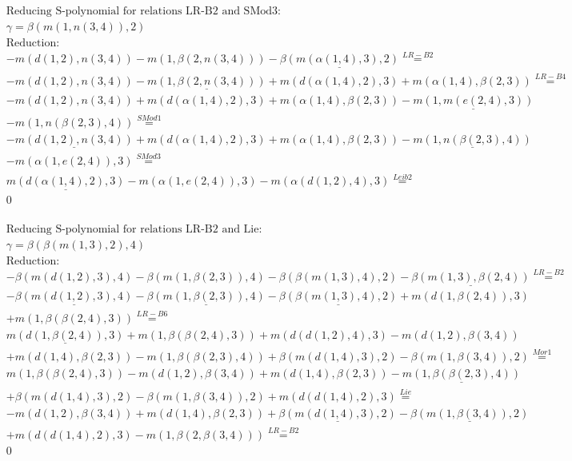 \documentclass[11pt]{amsart}
\begin{document}
\begin{align*} 
& \text{Reducing S-polynomial for relations LR-B2 and SMod3:} \\ 
& \gamma = \beta(m(1,n(3,4)),2) \\ 
& \text{Reduction}: \\& - m(d(1,2),n(3,4)) - m(1,\beta(2,n(3,4))) - \underline{\beta(m(\alpha(1,4),3),2)} \stackrel{ LR-B2 }{=}  \\ 
& - m(d(1,2),n(3,4)) - \underline{m(1,\beta(2,n(3,4)))} + m(d(\alpha(1,4),2),3) + m(\alpha(1,4),\beta(2,3)) \stackrel{ LR-B4 }{=}  \\ 
& - m(d(1,2),n(3,4)) + m(d(\alpha(1,4),2),3) + m(\alpha(1,4),\beta(2,3)) - \underline{m(1,m(e(2,4),3))}\\ 
 &  - m(1,n(\beta(2,3),4)) \stackrel{ SMod1 }{=}  \\ 
& - \underline{m(d(1,2),n(3,4))} + m(d(\alpha(1,4),2),3) + m(\alpha(1,4),\beta(2,3)) - \underline{m(1,n(\beta(2,3),4))}\\ 
 &  - m(\alpha(1,e(2,4)),3) \stackrel{ SMod3 }{=}  \\ 
&\underline{m(d(\alpha(1,4),2),3)} - m(\alpha(1,e(2,4)),3) - m(\alpha(d(1,2),4),3) \stackrel{ Leib2 }{=}  \\ 
&0\\ 
\end{align*} 
 
\begin{align*} 
& \text{Reducing S-polynomial for relations LR-B2 and Lie:} \\ 
& \gamma = \beta(\beta(m(1,3),2),4) \\ 
& \text{Reduction}: \\& - \beta(m(d(1,2),3),4) - \beta(m(1,\beta(2,3)),4) - \beta(\beta(m(1,3),4),2) - \underline{\beta(m(1,3),\beta(2,4))} \stackrel{ LR-B2 }{=}  \\ 
& - \underline{\beta(m(d(1,2),3),4)} - \underline{\beta(m(1,\beta(2,3)),4)} - \underline{\beta(\beta(m(1,3),4),2)} + m(d(1,\beta(2,4)),3)\\ 
 &  + m(1,\beta(\beta(2,4),3)) \stackrel{ LR-B6 }{=}  \\ 
&\underline{m(d(1,\beta(2,4)),3)} + m(1,\beta(\beta(2,4),3)) + m(d(d(1,2),4),3) - m(d(1,2),\beta(3,4))\\ 
 &  + m(d(1,4),\beta(2,3)) - m(1,\beta(\beta(2,3),4)) + \beta(m(d(1,4),3),2) - \beta(m(1,\beta(3,4)),2) \stackrel{ Mor1 }{=}  \\ 
&m(1,\beta(\beta(2,4),3)) - m(d(1,2),\beta(3,4)) + m(d(1,4),\beta(2,3)) - \underline{m(1,\beta(\beta(2,3),4))}\\ 
 &  + \beta(m(d(1,4),3),2) - \beta(m(1,\beta(3,4)),2) + m(d(d(1,4),2),3) \stackrel{ Lie }{=}  \\ 
& - m(d(1,2),\beta(3,4)) + m(d(1,4),\beta(2,3)) + \underline{\beta(m(d(1,4),3),2)} - \underline{\beta(m(1,\beta(3,4)),2)}\\ 
 &  + m(d(d(1,4),2),3) - m(1,\beta(2,\beta(3,4))) \stackrel{ LR-B2 }{=}  \\ 
&0\\ 
\end{align*} 
 
\end{document}
